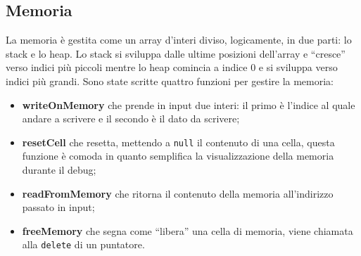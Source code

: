 \documentclass[../report.tex]{subfiles}
\begin{document}
\subsection{Memoria}
La memoria \`e gestita come un array d'interi diviso, logicamente, in due parti: lo stack e lo heap. Lo stack si sviluppa dalle ultime posizioni dell'array e ``cresce'' verso indici pi\`u piccoli mentre lo heap comincia a indice 0 e si sviluppa verso indici pi\`u grandi. Sono state scritte quattro funzioni per gestire la memoria:
\begin{itemize}
    \item \textbf{writeOnMemory} che prende in input due interi: il primo \`e l'indice al quale andare a scrivere e il secondo \`e il dato da scrivere;
    \item \textbf{resetCell} che resetta, mettendo a \verb|null| il contenuto di una cella, questa funzione \`e comoda in quanto semplifica la visualizzazione della memoria durante il debug;
    \item \textbf{readFromMemory} che ritorna il contenuto della memoria all'indirizzo passato in input;
    \item \textbf{freeMemory} che segna come ``libera'' una cella di memoria, viene chiamata alla \verb|delete| di un puntatore.
\end{itemize}
\end{document}
